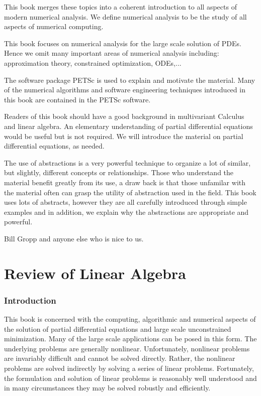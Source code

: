 This book merges these topics into a coherent introduction to
all aspects of modern numerical analysis. We define numerical analysis
to be the study of all aspects of numerical computing. 

This book focuses on numerical analysis for the large scale solution of 
PDEs. Hence we omit many important areas of numerical analysis including:
approximation theory, constrained optimization, ODEs,...

The software package PETSc is used to explain and motivate the material.
Many of the numerical algorithms and software engineering techniques
introduced in this book are contained in the PETSc software. 

Readers of this book should have a good background in multivariant Calculus
and linear algebra. An elementary understanding of partial differential 
equations would be useful but is not required. We will introduce the material
on partial differential equations, as needed.

The use of abstractions is a very powerful technique to organize a lot of 
similar, but slightly, different concepts or relationships. Those who understand
the material benefit greatly from its use, a draw back is that those unfamilar 
with the material often can grasp the utility of abstraction used in the 
field. This book uses lots of abstracts, however they are all carefully introduced
through simple examples and in addition, we explain why the abstractions are 
appropriate and powerful.

\vspace{1in}

Bill Gropp and anyone else who is nice to us.

\medskip \medskip 

\setcounter{page}{3}
\tableofcontents
\clearpage
{}


\chapter{Review of Linear Algebra} 
\label{chapter:rola}

\subsection{Introduction}
This book is concerned with the computing, algorithmic and numerical 
aspects of the solution of partial differential equations and large
scale unconstrained minimization. Many of the large scale applications 
can be posed in this form. The underlying problems are generally nonlinear.
Unfortunately, nonlinear problems are invariably difficult and cannot be 
solved directly. Rather, the nonlinear problems are solved indirectly by 
solving a series of linear problems. Fortunately, the formulation and solution
of linear problems is reasonably well understood and in many circumstances
they may be solved robustly and efficiently. 

